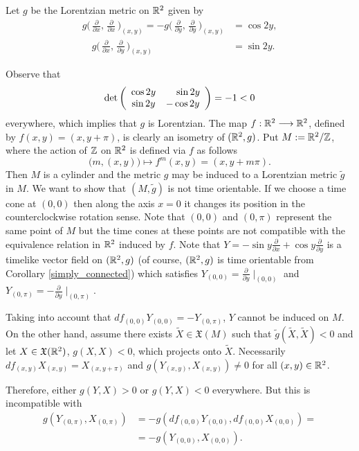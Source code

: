 \begin{example}
    Let $g$ be the Lorentzian metric on $\mathbb{R}^2$ given by
    \begin{align*}
        g\Big(\,\frac{\partial}{\partial x},\,\frac{\partial}{\partial x}\,\Big)_{(x,y)}=-g\Big(\,\frac{\partial}{\partial y},\,\frac{\partial}{\partial y}\,\Big)_{(x,y)} &= \cos 2y,\\
        \quad g\Big(\,\frac{\partial}{\partial x},\,\frac{\partial}{\partial y}\,\Big)_{(x,y)}&= \sin 2y.
    \end{align*}

    Observe that
    \[
        \mathrm{det}\left(
        \begin{array}{cc}
            \cos 2y & \hspace*{4mm}\sin 2y  \\
            \sin 2y & -\cos 2y
        \end{array} \right) = -1 < 0
    \]
    everywhere, which implies that $g$ is Lorentzian.
    The map $f : \mathbb{R}^2 \longrightarrow \mathbb{R}^2$, defined by $f(x,y)=(x,y+\pi)$, is clearly an isometry of $(\mathbb{R}^2,g)$.
    Put $M:=\mathbb{R}^2 / {\mathbb Z}$, where the action of ${\mathbb Z}$ on $\mathbb{R}^2$ is defined via $f$ as follows $$\big(m,(x,y)\big) \mapsto f^m(x,y)=(x,y+m\pi).$$
    Then $M$ is a cylinder and the metric $g$ may be induced to a Lorentzian metric ${\tilde g}$ in $M$.
    We want to show that
    $(M,{\tilde g})$ is not time orientable.
    If we choose a time cone at $(0,0)$ then along the axis $x=0$ it changes its position in the counterclockwise rotation sense.
    Note that $(0,0)$ and $(0,\pi)$ represent the same point of $M$ but the time cones at these points are not compatible with the equivalence relation in $\mathbb{R}^2$ induced by $f$.
    Note that $Y=-\sin y \frac{\partial}{\partial x} + \cos y \frac{\partial}{\partial y}$ is a timelike vector field on
    $(\mathbb{R}^2,g)$ (of course, $(\mathbb{R}^2,g)$ is time orientable from Corollary \ref{simply_connected}) which satisfies $Y_{(0,0)}=\frac{\partial}{\partial y}\mid_{(0,0)}$ and $Y_{(0,\pi)}=-\frac{\partial}{\partial y}\mid_{(0,\pi)}$.

    Taking into account that $df_{(0,0)}Y_{(0,0)}=-Y_{(0,\pi)}$, $Y$ cannot be induced on $M$. On the other hand, assume there exists ${\tilde X}\in \mathfrak{X}(M)$ such that ${\tilde g}({\tilde X},{\tilde X})<0$ and let $X\in \mathfrak{X}(\mathbb{R}^2)$, $g(X,X)<0$, which projects onto ${\tilde X}$.
    Necessarily $df_{(x,y)}X_{(x,y)}=X_{(x,y+\pi)}$ and $g(Y_{(x,y)},X_{(x,y)})\neq 0$ for all $(x,y)\in \mathbb{R}^2$.

    Therefore, either $g(Y,X)>0$ or $g(Y,X)<0$ everywhere. But this is incompatible with
    \begin{align*}
        g\left(Y_{(0,\pi)},X_{(0,\pi)}\right) &= -g\left(df_{(0,0)}Y_{(0,0)},df_{(0,0)}X_{(0,0)}\right)=\\
        &= -g\left(Y_{(0,0)},X_{(0,0)}\right).
    \end{align*}

\end{example}


